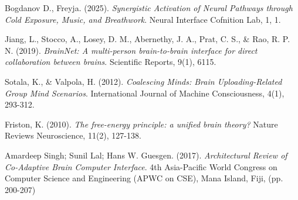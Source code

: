 \documentclass[11pt]{article}
\begin{document}
\begin{thebibliography}{99}
 Bogdanov D., Freyja. (2025). \textit{Synergistic Activation of Neural Pathways through Cold Exposure, Music, and Breathwork}. Neural Interface Cofnition Lab, 1, 1. 

 Jiang, L., Stocco, A., Losey, D. M., Abernethy, J. A., Prat, C. S., \& Rao, R. P. N. (2019). \textit{BrainNet: A multi-person brain-to-brain interface for direct collaboration between brains}. Scientific Reports, 9(1), 6115.

 Sotala, K., \& Valpola, H. (2012). \textit{Coalescing Minds: Brain Uploading-Related Group Mind Scenarios}. International Journal of Machine Consciousness, 4(1), 293-312.

 Friston, K. (2010). \textit{The free-energy principle: a unified brain theory?} Nature Reviews Neuroscience, 11(2), 127-138.

 Amardeep Singh; Sunil Lal; Hans W. Guesgen. (2017). \textit{Architectural Review of Co-Adaptive Brain Computer Interface}. 4th Asia-Pacific World Congress on Computer Science and Engineering (APWC on CSE), Mana Island, Fiji, (pp. 200-207)

\end{thebibliography}
\end{document}
